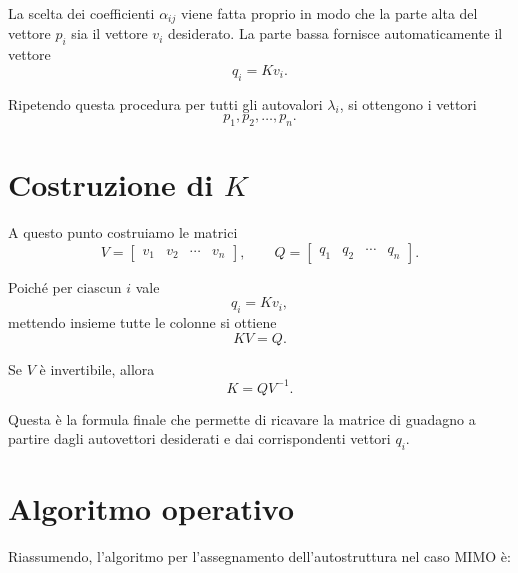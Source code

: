 La scelta dei coefficienti \(\alpha_{ij}\) viene fatta proprio in modo che
la parte alta del vettore \(p_i\) sia il vettore \(v_i\) desiderato.
La parte bassa fornisce automaticamente il vettore
\[
q_i=Kv_i.
\]

Ripetendo questa procedura per tutti gli autovalori \(\lambda_i\),
si ottengono i vettori
\[
p_1,p_2,\dots,p_n.
\]

\section{Costruzione di \(K\)}

A questo punto costruiamo le matrici
\[
V=
\begin{bmatrix}
v_1 & v_2 & \cdots & v_n
\end{bmatrix},
\qquad
Q=
\begin{bmatrix}
q_1 & q_2 & \cdots & q_n
\end{bmatrix}.
\]

Poiché per ciascun \(i\) vale
\[
q_i=Kv_i,
\]
mettendo insieme tutte le colonne si ottiene
\[
KV=Q.
\]

Se \(V\) è invertibile, allora
\[
K=QV^{-1}.
\]

Questa è la formula finale che permette di ricavare la matrice di guadagno
a partire dagli autovettori desiderati e dai corrispondenti vettori \(q_i\).

\section{Algoritmo operativo}

Riassumendo, l'algoritmo per l'assegnamento dell'autostruttura nel caso MIMO è:

